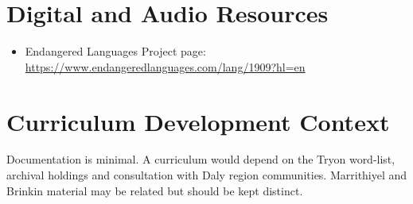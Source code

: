 \documentclass[12pt]{article}
\begin{document}
\section{Digital and Audio Resources}
\begin{itemize}
\item Endangered Languages Project page: \url{https://www.endangeredlanguages.com/lang/1909?hl=en}
\end{itemize}

\section{Curriculum Development Context}
Documentation is minimal. A curriculum would depend on the Tryon word-list, archival holdings and consultation with Daly region communities. Marrithiyel and Brinkin material may be related but should be kept distinct.
\end{document}
